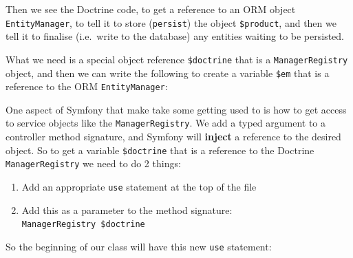 \documentclass[a4paperpaper,openright]{book}
\newenvironment{Shaded}{}{}
\newcommand{\KeywordTok}[1]{\textcolor[rgb]{0.00,0.44,0.13}{\textbf{#1}}}
\newcommand{\NormalTok}[1]{#1}
\newcommand{\OtherTok}[1]{\textcolor[rgb]{0.00,0.44,0.13}{#1}}
\begin{document}
\begin{Shaded}
\end{Shaded}

Then we see the Doctrine code, to get a reference to an ORM object
\texttt{EntityManager}, to tell it to store (\texttt{persist}) the
object \texttt{\$product}, and then we tell it to finalise (i.e.~write
to the database) any entities waiting to be persisted.

What we need is a special object reference \texttt{\$doctrine} that is a
\texttt{ManagerRegistry} object, and then we can write the following to
create a variable \texttt{\$em} that is a reference to the ORM
\texttt{EntityManager}:

\begin{Shaded}
\end{Shaded}

One aspect of Symfony that make take some getting used to is how to get
access to service objects like the \texttt{ManagerRegistry}. We add a
typed argument to a controller method signature, and Symfony will
\textbf{inject} a reference to the desired object. So to get a variable
\texttt{\$doctrine} that is a reference to the Doctrine
\texttt{ManagerRegistry} we need to do 2 things:

\begin{enumerate}
\def\labelenumi{\arabic{enumi}.}
\item
  Add an appropriate \texttt{use} statement at the top of the file
\item
  Add this as a parameter to the method signature:
  \texttt{ManagerRegistry\ \$doctrine}
\end{enumerate}

So the beginning of our class will have this new \texttt{use} statement:
\end{document}
